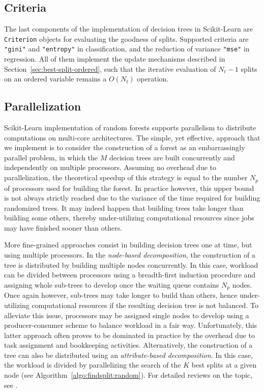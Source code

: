 \subsection{Criteria}

The last components of the implementation of decision trees in Scikit-Learn are
\texttt{Criterion} objects for evaluating the goodness of splits. Supported
criteria are \texttt{"gini"} and \texttt{"entropy"} in classification, and the
reduction of variance \texttt{"mse"} in regression. All of them implement the
update mechanisms described in Section~\ref{sec:best-split-ordered}, such that
the iterative evaluation of $N_t-1$ splits on an ordered variable remains a
$O(N_t)$ operation.

\subsection{Parallelization}

Scikit-Learn implementation of random forests supports parallelism to
distribute computations on multi-core architectures. The simple, yet effective,
approach that we implement is to consider the construction of a forest as an
embarrassingly parallel problem, in which the $M$ decision trees are built
concurrently and independently on multiple processors. Assuming no overhead due
to parallelization, the theoretical speedup of this strategy is equal to the
number $N_p$ of processors used for building the forest. In practice however,
this upper bound is not always strictly reached due to the variance of the time
required for building randomized trees. It may indeed happen that building
trees take longer  than building some others, thereby under-utilizing
computational resources since jobs may have finished sooner than others.

More fine-grained approaches consist in building decision trees one at time,
but using multiple processors. In the \textit{node-based decomposition}, the
construction of a tree is distributed by building multiple nodes concurrently.
In this case, workload can be divided between processors using a breadth-first
induction procedure and assigning whole sub-trees to develop once the waiting
queue contains $N_p$ nodes. Once again however, sub-trees may take longer to
build than others, hence under-utilizing computational resources if the
resulting decision tree is not balanced. To alleviate this issue, processors
may be assigned single nodes to develop using a producer-consumer scheme to
balance workload in a fair way. Unfortunately, this latter approach often proves to be
dominated in practice by the overhead due to task assignment and bookkeeping
activities. Alternatively, the construction of a tree can also be distributed
using an \textit{attribute-based decomposition}. In this case, the workload is
divided by parallelizing the search of the $K$ best splits at a given node (see
Algorithm~\ref{algo:findsplit:random}). For detailed reviews on the topic, see
\citep{kufrin:1997,srivastava:2002}.

